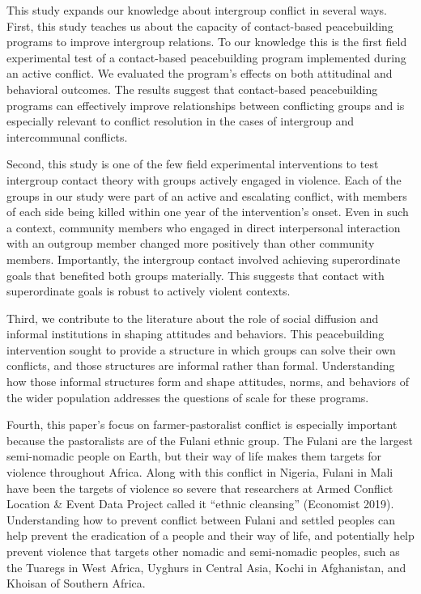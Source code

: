 \documentclass[11pt]{article}
\begin{document}
This study expands our knowledge about intergroup conflict in several
ways. First, this study teaches us about the capacity of contact-based
peacebuilding programs to improve intergroup relations. To our knowledge
this is the first field experimental test of a contact-based
peacebuilding program implemented during an active conflict. We
evaluated the program's effects on both attitudinal and behavioral
outcomes. The results suggest that contact-based peacebuilding programs
can effectively improve relationships between conflicting groups and is
especially relevant to conflict resolution in the cases of intergroup
and intercommunal conflicts.

Second, this study is one of the few field experimental interventions to
test intergroup contact theory with groups actively engaged in violence.
Each of the groups in our study were part of an active and escalating
conflict, with members of each side being killed within one year of the
intervention's onset. Even in such a context, community members who
engaged in direct interpersonal interaction with an outgroup member
changed more positively than other community members. Importantly, the
intergroup contact involved achieving superordinate goals that benefited
both groups materially. This suggests that contact with superordinate
goals is robust to actively violent contexts.

Third, we contribute to the literature about the role of social
diffusion and informal institutions in shaping attitudes and behaviors.
This peacebuilding intervention sought to provide a structure in which
groups can solve their own conflicts, and those structures are informal
rather than formal. Understanding how those informal structures form and
shape attitudes, norms, and behaviors of the wider population addresses
the questions of scale for these programs.

Fourth, this paper's focus on farmer-pastoralist conflict is especially
important because the pastoralists are of the Fulani ethnic group. The
Fulani are the largest semi-nomadic people on Earth, but their way of
life makes them targets for violence throughout Africa. Along with this
conflict in Nigeria, Fulani in Mali have been the targets of violence so
severe that researchers at Armed Conflict Location \& Event Data Project
called it ``ethnic cleansing'' (Economist 2019). Understanding how to
prevent conflict between Fulani and settled peoples can help prevent the
eradication of a people and their way of life, and potentially help
prevent violence that targets other nomadic and semi-nomadic peoples,
such as the Tuaregs in West Africa, Uyghurs in Central Asia, Kochi in
Afghanistan, and Khoisan of Southern Africa.
\end{document}
